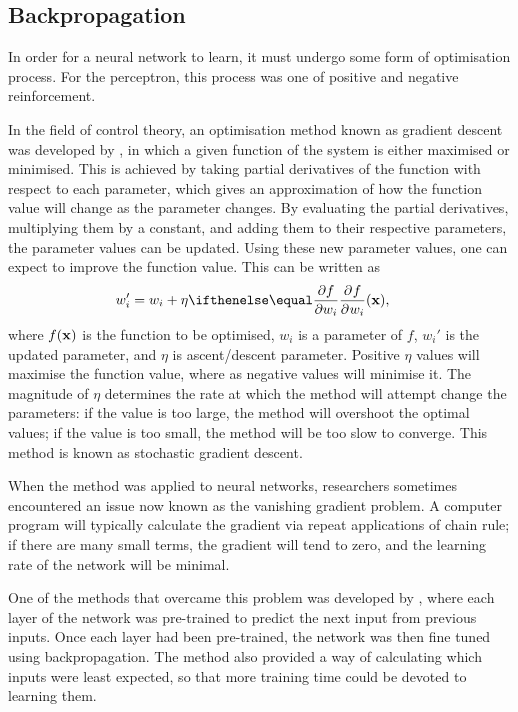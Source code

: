 


\subsection{Backpropagation}

In order for a neural network to learn, it must undergo some form of
optimisation process.
For the perceptron, this process was one of positive and negative reinforcement.



In the field of control theory, an optimisation method known as gradient descent
was developed by \cite{Kelley:1960:Gradient}, in which a given function of the
system is either maximised or minimised.
This is achieved by taking partial derivatives of the function with respect to
each parameter, which gives an approximation of how the function value will
change as the parameter changes.
By evaluating the partial derivatives, multiplying them by a constant, and
adding them to their respective parameters, the parameter values can be updated.
Using these new parameter values, one can expect to improve the function value.
This can be written as
\begin{align*}
    w_i' &= w_i + \eta\Rpdiff{f}{w_i}(\Rvec{x}),
\end{align*}
where $f(\mathbf{x})$ is the function to be optimised, $w_i$ is a parameter of
$f$, $w_i'$ is the updated parameter, and $\eta$ is ascent/descent parameter.
Positive $\eta$ values will maximise the function value, where as negative
values will minimise it.
The magnitude of $\eta$ determines the rate at which the method will attempt
change the parameters: if the value is too large, the method will overshoot the
optimal values; if the value is too small, the method will be too slow to
converge.
This method is known as stochastic gradient descent.

When the method was applied to neural networks, researchers sometimes
encountered an issue now known as the vanishing gradient problem.
A computer program will typically calculate the gradient via repeat applications
of chain rule; if there are many small terms, the gradient will tend to zero,
and the learning rate of the network will be minimal.



One of the methods that overcame this problem was developed by
\cite{Schmidhuber:1992:Compression}, where each layer of the network was
pre-trained to predict the next input from previous inputs.
Once each layer had been pre-trained, the network was then fine tuned using
backpropagation.
The method also provided a way of calculating which inputs were least expected,
so that more training time could be devoted to learning them.

